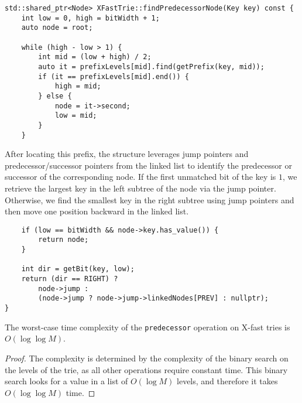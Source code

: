 \begin{verbatim}
std::shared_ptr<Node> XFastTrie::findPredecessorNode(Key key) const {
    int low = 0, high = bitWidth + 1;
    auto node = root;

    while (high - low > 1) {
        int mid = (low + high) / 2;
        auto it = prefixLevels[mid].find(getPrefix(key, mid));
        if (it == prefixLevels[mid].end()) {
            high = mid;
        } else {
            node = it->second;
            low = mid;
        }
    }
\end{verbatim}

After locating this prefix, the structure leverages jump pointers and predecessor/successor pointers from the linked list to identify the predecessor or successor of the corresponding node. If the first unmatched bit of the key is \(1\), we retrieve the largest key in the left subtree of the node via the jump pointer. Otherwise, we find the smallest key in the right subtree using jump pointers and then move one position backward in the linked list.

\begin{verbatim}
    if (low == bitWidth && node->key.has_value()) {
        return node;
    }

    int dir = getBit(key, low);
    return (dir == RIGHT) ? 
        node->jump :
        (node->jump ? node->jump->linkedNodes[PREV] : nullptr);
}
\end{verbatim}

\begin{lemma}
The worst-case time complexity of the \texttt{predecessor} operation on X-fast tries is \( O(\log \log M) \).
\end{lemma}

\begin{proof}
The complexity is determined by the complexity of the binary search on the levels of the trie, as all other operations require constant time. This binary search looks for a value in a list of \( O(\log M) \) levels, and therefore it takes \( O(\log \log M) \) time.
\end{proof}
